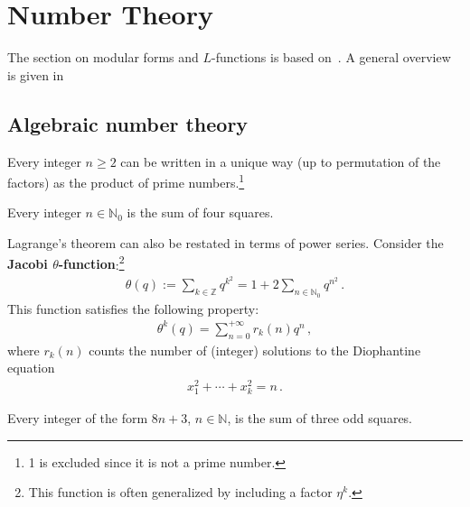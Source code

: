 \chapter{Number Theory}

    The section on modular forms and $L$-functions is based on~\cite{sutherland_modular_2017,mustata_zeta_2011}. A general overview is given in~\cite{waldschmidt_number_1992}

    \minitoc

\section{Algebraic number theory}


    \begin{theorem}\label{number:prime_factorization}
        Every integer $n\geq2$ can be written in a unique way (up to permutation of the factors) as the product of prime numbers.\footnote{1 is excluded since it is not a prime number.}
    \end{theorem}

    \begin{theorem}[Lagrange]
        Every integer $n\in\mathbb{N}_0$ is the sum of four squares.
    \end{theorem}

    Lagrange's theorem can also be restated in terms of power series. Consider the \textbf{Jacobi $\theta$-function}:\footnote{This function is often generalized by including a factor $\eta^k$.}
    \begin{gather}
        \theta(q) := \sum_{k\in\mathbb{Z}}q^{k^2} = 1 + 2\sum_{n\in\mathbb{N}_0}q^{n^2}\,.
    \end{gather}
    This function satisfies the following property:
    \begin{gather}
        \label{number:theta_function}
        \theta^k(q) = \sum_{n=0}^{+\infty}r_k(n)q^n\,,
    \end{gather}
    where $r_k(n)$ counts the number of (integer) solutions to the Diophantine equation
    \begin{gather}
        x_1^2+\cdots+x_k^2=n\,.
    \end{gather}

    \begin{theorem}[Gauss]
        Every integer of the form $8n+3$, $n\in\mathbb{N}$, is the sum of three odd squares.
    \end{theorem}

